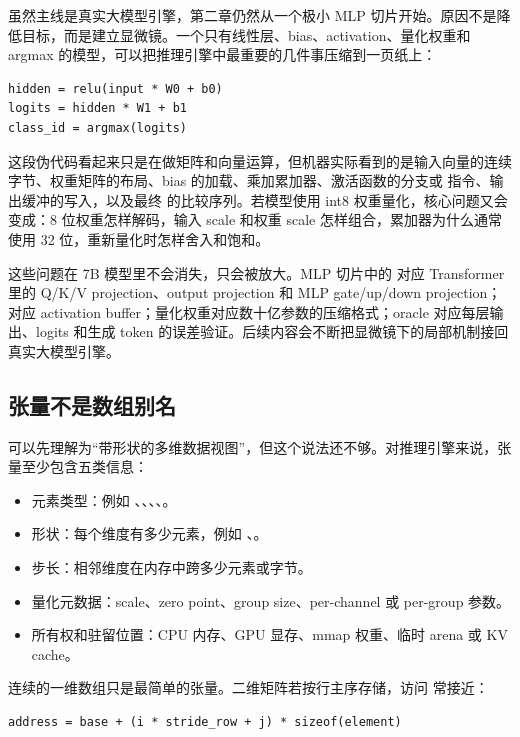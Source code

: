 虽然主线是真实大模型引擎，第二章仍然从一个极小 MLP 切片开始。原因不是降低目标，而是建立显微镜。一个只有线性层、bias、activation、量化权重和 argmax 的模型，可以把推理引擎中最重要的几件事压缩到一页纸上：

\begin{lstlisting}[numbers=none,caption={最小切片的推理语义}]
hidden = relu(input * W0 + b0)
logits = hidden * W1 + b1
class_id = argmax(logits)
\end{lstlisting}

这段伪代码看起来只是在做矩阵和向量运算，但机器实际看到的是输入向量的连续字节、权重矩阵的布局、bias 的加载、乘加累加器、激活函数的分支或  指令、输出缓冲的写入，以及最终  的比较序列。若模型使用 int8 权重量化，核心问题又会变成：8 位权重怎样解码，输入 scale 和权重 scale 怎样组合，累加器为什么通常使用 32 位，重新量化时怎样舍入和饱和。

这些问题在 7B 模型里不会消失，只会被放大。MLP 切片中的  对应 Transformer 里的 Q/K/V projection、output projection 和 MLP gate/up/down projection； 对应 activation buffer；量化权重对应数十亿参数的压缩格式；oracle 对应每层输出、logits 和生成 token 的误差验证。后续内容会不断把显微镜下的局部机制接回真实大模型引擎。

\subsection{张量不是数组别名}

 可以先理解为“带形状的多维数据视图”，但这个说法还不够。对推理引擎来说，张量至少包含五类信息：

\begin{itemize}
  \item 元素类型：例如 、、、、。
  \item 形状：每个维度有多少元素，例如 、。
  \item 步长：相邻维度在内存中跨多少元素或字节。
  \item 量化元数据：scale、zero point、group size、per-channel 或 per-group 参数。
  \item 所有权和驻留位置：CPU 内存、GPU 显存、mmap 权重、临时 arena 或 KV cache。
\end{itemize}

连续的一维数组只是最简单的张量。二维矩阵若按行主序存储，访问  常接近：

\begin{lstlisting}[numbers=none,caption={行主序矩阵的地址计算}]
address = base + (i * stride_row + j) * sizeof(element)
\end{lstlisting}

